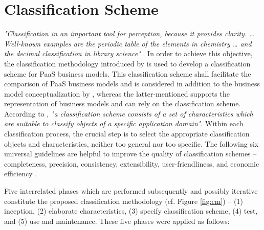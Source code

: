 \section{Classification Scheme}\label{ch:sota:cm}

\textit{"Classification in an important tool for perception, because it provides clarity. \ldots\xspace Well-known examples are the periodic table of the elements in chemistry \ldots\xspace and the decimal classification in library science"} \citep[p. 36]{Fettke2003}. In order to achieve this objective, the classification methodology introduced by \citet{Fettke2003} is used to develop a classification scheme for \ac{PaaS} business models. This classification scheme shall facilitate the comparison of \ac{PaaS} business models and is considered in addition to the business model conceptualization by \citet{Johnson2008}, whereas the latter-mentioned supports the representation of business models and can rely on the classification scheme. According to \citet[p. 39]{Fettke2003}, \textit{"a classification scheme consists of a set of characteristics which are suitable to classify objects of a specific application domain"}. Within each classification process, the crucial step is to select the appropriate classification objects and characteristics, neither too general nor too specific. The following six universal guidelines are helpful to improve the quality of classification schemes -- completeness, precision, consistency, extensibility, user-friendliness, and economic efficiency \citep[pp. 40-41]{Fettke2003}. 

Five interrelated phases which are performed subsequently and possibly iterative constitute the proposed classification methodology (cf. Figure \ref{fig:cm}) -- (1) inception, (2) elaborate characteristics, (3) specify classification scheme, (4) test, and (5) use and maintenance. These five phases were applied as follows:


